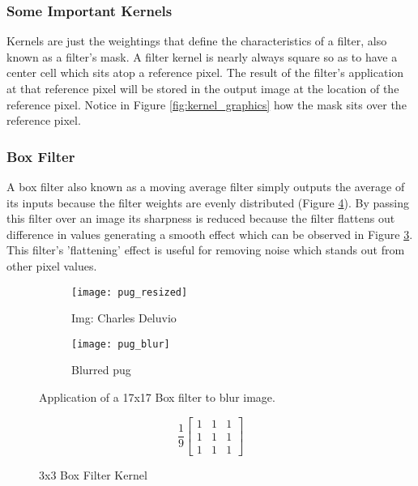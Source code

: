 \subsubsection{Some Important Kernels}
\label{subsubsection:kernels}
Kernels are just the weightings that define the characteristics of a filter, also known as a filter's mask. A filter kernel is nearly always square so as to have a center cell which sits atop a reference pixel. The result of the filter's application at that reference pixel will be stored in the output image at the location of the reference pixel. Notice in Figure \ref{fig:kernel_graphics} how the mask sits over the reference pixel.

\subsubsection{Box Filter}
\label{subsubsection:boxfilter}
A box filter also known as a moving average filter simply outputs the average of its inputs because the filter weights are evenly distributed (Figure \ref{fig:box_kernel}). By passing this filter over an image its sharpness is reduced because the filter flattens out difference in values generating a smooth effect which can be observed in Figure \ref{fig:pug_blur}. This filter's 'flattening' effect is useful for removing noise which stands out from other pixel values.


\begin{figure}[H]
    \centering
    \begin{subfigure}[b]{0.3\textwidth}
        \texttt{[image: pug\_resized]}
        \caption{Img: Charles Deluvio}
        \label{fig:pug_noise}
    \end{subfigure}
    \begin{subfigure}[b]{0.3\textwidth}
        \texttt{[image: pug\_blur]}
        \caption{Blurred pug}
        \label{fig:pug_denoised}
    \end{subfigure}
    \caption{Application of a 17x17 Box filter to blur image.}
    \label{fig:pug_blur}
\end{figure}

\begin{figure}[H]
   \centering
   \[
     \frac{1}{9}
   \begin{bmatrix}
      1 & 1 & 1 \\
      1 & 1 & 1 \\
      1 & 1 & 1
   \end{bmatrix}
   \]
   \caption{3x3 Box Filter Kernel}
   \label{fig:box_kernel}
\end{figure}

